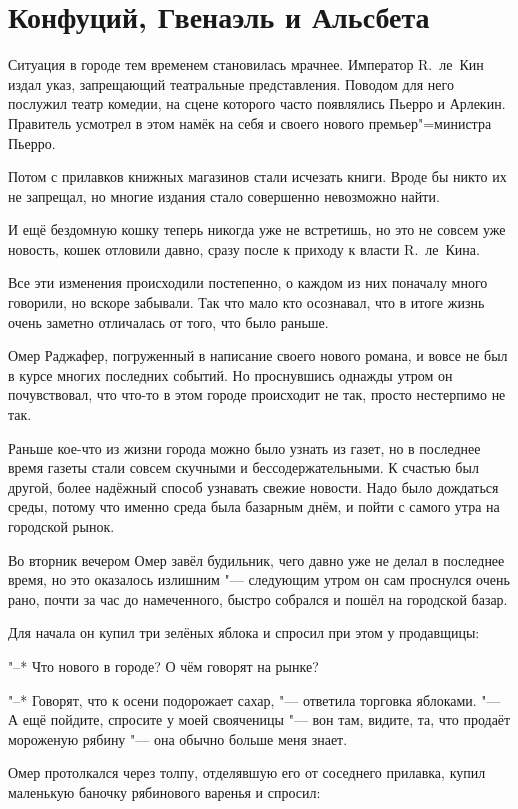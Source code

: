 \section{Конфуций, Гвенаэль и Альсбета}

Ситуация в городе тем временем становилась мрачнее.
Император R.~ле~Кин издал указ, запрещающий театральные представления.
Поводом для него послужил театр комедии, на сцене которого часто появлялись
Пьерро и Арлекин.
Правитель усмотрел в этом намёк на себя и своего нового премьер"=министра
Пьерро.

Потом с прилавков книжных магазинов стали исчезать книги.
Вроде бы никто их не запрещал, но многие издания стало совершенно невозможно
найти.

И ещё бездомную кошку теперь никогда уже не встретишь, но это не совсем уже
новость, кошек отловили давно, сразу после к приходу к власти R.~ле~Кина.

Все эти изменения происходили постепенно, о каждом из них поначалу много
говорили, но вскоре забывали.
Так что мало кто осознавал, что в итоге жизнь очень заметно отличалась от того,
что было раньше.

Омер Раджафер, погруженный в написание своего нового романа, и вовсе не был в
курсе многих последних событий.
Но проснувшись однажды утром он почувствовал, что что-то в этом городе
происходит не так, просто нестерпимо не так.

Раньше кое-что из жизни города можно было узнать из газет, но в последнее время
газеты стали совсем скучными и бессодержательными.
К счастью был другой, более надёжный способ узнавать свежие новости.
Надо было дождаться среды, потому что именно среда была базарным днём, и пойти с
самого утра на городской рынок.

Во вторник вечером Омер завёл будильник, чего давно уже не делал в последнее
время, но это оказалось излишним "--- следующим утром он сам проснулся очень
рано, почти за час до намеченного, быстро собрался и пошёл на городской базар.

Для начала он купил три зелёных яблока и спросил при этом у продавщицы:

"--* Что нового в городе?
О чём говорят на рынке?

"--* Говорят, что к осени подорожает сахар, "--- ответила торговка яблоками.
"--- А ещё пойдите, спросите у моей свояченицы "--- вон там, видите, та, что
продаёт мороженую рябину "--- она обычно больше меня знает.

Омер протолкался через толпу, отделявшую его от соседнего прилавка, купил
маленькую баночку рябинового варенья и спросил:

